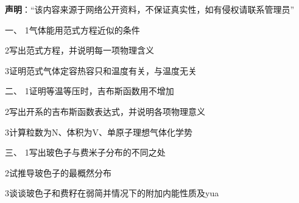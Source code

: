 
\textbf{声明}：“该内容来源于网络公开资料，不保证真实性，如有侵权请联系管理员”



一、
{1}气体能用范式方程近似的条件

{2}写出范式方程，并说明每一项物理含义

{3}证明范式气体定容热容只和温度有关，与温度无关


二、
{1}证明等温等压时，吉布斯函数用不增加

{2}写出开系的吉布斯函数表达式，并说明各项物理意义

{3}计算粒数为N、体积为V、单原子理想气体化学势

三、
{1}写出玻色子与费米子分布的不同之处

{2}试推导玻色子的最概然分布

{3}谈谈玻色子和费籽在弱简并情况下的附加内能性质及yua